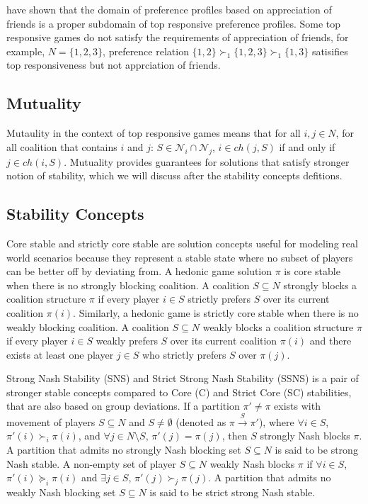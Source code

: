 \documentclass[letterpaper]{article} %
\begin{document}
\cite{SuSu10} have shown that the domain of preference profiles based on appreciation of friends is a proper subdomain of top responsive preference profiles. Some top responsive games do not satisfy the requirements of appreciation of friends, for example, $N = \{1, 2, 3\}$, preference relation $\{1, 2\} \succ_1 \{1, 2, 3\} \succ_1 \{1, 3\}$ satisifies top responsiveness but not apprciation of friends.

\subsection{Mutuality}
Mutaulity in the context of top responsive games means that for all $i, j \in N$, for all coalition that contains $i$ and $j$: $S \in \mathcal{N}_i \cap \mathcal{N}_j$, $i \in ch(j, S)$ if and only if $j \in ch(i, S)$. Mutuality provides guarantees for solutions that satisfy stronger notion of stability, which we will discuss after the stability concepts defitions.

\subsection{Stability Concepts}
Core stable and strictly core stable are solution concepts useful for modeling real world scenarios because they represent a stable state where no subset of players can be better off by deviating from. A hedonic game solution $\pi$ is core stable when there is no strongly blocking coalition. A coalition $S \subseteq N$ strongly blocks a coalition structure $\pi$ if every player $i \in S$ strictly prefers $S$ over its current coalition $\pi(i)$. Similarly, a hedonic game is strictly core stable when there is no weakly blocking coalition. A coalition $S \subseteq N$ weakly blocks a coalition structure $\pi$ if every player $i \in S$ weakly prefers $S$ over its current coalition $\pi(i)$ and there exists at least one player $j \in S$ who strictly prefers $S$ over $\pi(j)$.

Strong Nash Stability (SNS) and Strict Strong Nash Stability (SSNS) is a pair of stronger stable concepts compared to Core (C) and Strict Core (SC) stabilities, that are also based on group deviations. If a partition $\pi' \neq \pi$ exists with movement of players $S \subseteq N$ and $S \neq \emptyset$ (denoted as $\pi \xrightarrow{S} \pi'$), where $\forall i \in S$, $\pi'(i) \succ_i \pi(i)$, and $\forall j \in N\text{\textbackslash}S$, $\pi'(j) = \pi(j)$, then $S$ strongly Nash blocks $\pi$. A partition that admits no strongly Nash blocking set $S \subseteq N$ is said to be strong Nash stable. A non-empty set of player $S \subseteq N$ weakly Nash blocks $\pi$ if $\forall i \in S$, $\pi'(i) \succeq_i \pi(i)$ and $\exists j \in S$, $\pi'(j) \succ_j \pi(j)$. A partition that admits no weakly Nash blocking set $S \subseteq N$ is said to be strict strong Nash stable.
\end{document}
